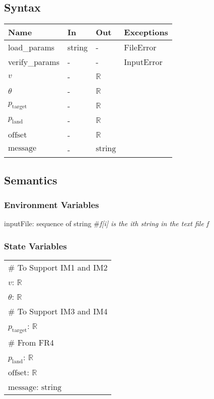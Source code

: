 \documentclass[12pt, titlepage]{article}
\begin{document}
\subsection{Syntax}

\begin{tabular}{p{3cm} p{1cm} p{1cm} >{\raggedright\arraybackslash}p{9cm}}
\toprule
\textbf{Name} & \textbf{In} & \textbf{Out} & \textbf{Exceptions} \\
\midrule
load\_params & string & - &  FileError \\
verify\_params & - & - & InputError \\
$v$ & - & $\mathbb{R}$\\
$\theta$ & - & $\mathbb{R}$\\
$p_{\text{target}}$ & - & $\mathbb{R}$\\
$p_{\text{land}}$ & - & $\mathbb{R}$\\
$\text{offset}$ & - & $\mathbb{R}$\\
$\text{message}$ & - & $\text{string}$\\
\bottomrule
\end{tabular}

\subsection{Semantics}

\subsubsection{Environment Variables}

inputFile: sequence of string \#\textit{f[i] is the ith string in the text file f}

\subsubsection{State Variables}

\renewcommand{\arraystretch}{1.2}
\begin{longtable*}[l]{l} 
\# To Support IM1 and IM2 \\
$v$: $\mathbb{R}$\\
$\theta$: $\mathbb{R}$\\
\# To Support IM3 and IM4 \\
$p_{\text{target}}$: $\mathbb{R}$\\
\# From FR4 \\
$p_{\text{land}}$: $\mathbb{R}$\\
$\text{offset}$: $\mathbb{R}$\\
$\text{message}$: $\text{string}$\\
\end{longtable*}
\end{document}
